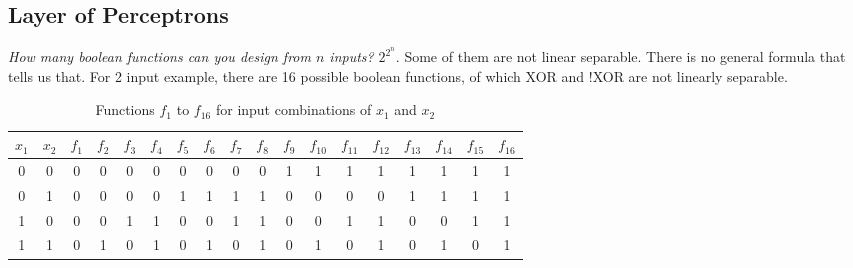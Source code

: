 \subsection{Layer of Perceptrons}

\textit{How many boolean functions can you design from $n$ inputs?} $2^{2^n}$. Some of them are not linear separable. There is no general formula that tells us that. For 2 input example, there are 16 possible boolean functions, of which XOR and !XOR are not linearly separable. 

\begin{table}[h]
\centering
\begin{tabular}{cc|cccccccccccccccc}
$x_1$ & $x_2$ & $f_1$ & $f_2$ & $f_3$ & $f_4$ & $f_5$ & $f_6$ & $f_7$ & $f_8$ & $f_9$ & $f_{10}$ & $f_{11}$ & $f_{12}$ & $f_{13}$ & $f_{14}$ & $f_{15}$ & $f_{16}$ \\
\hline
0 & 0 & 0 & 0 & 0 & 0 & 0 & 0 & 0 & 0 & 1 & 1 & 1 & 1 & 1 & 1 & 1 & 1 \\
0 & 1 & 0 & 0 & 0 & 0 & 1 & 1 & 1 & 1 & 0 & 0 & 0 & 0 & 1 & 1 & 1 & 1 \\
1 & 0 & 0 & 0 & 1 & 1 & 0 & 0 & 1 & 1 & 0 & 0 & 1 & 1 & 0 & 0 & 1 & 1 \\
1 & 1 & 0 & 1 & 0 & 1 & 0 & 1 & 0 & 1 & 0 & 1 & 0 & 1 & 0 & 1 & 0 & 1 \\
\end{tabular}
\caption{Functions $f_1$ to $f_{16}$ for input combinations of $x_1$ and $x_2$}
\end{table}

